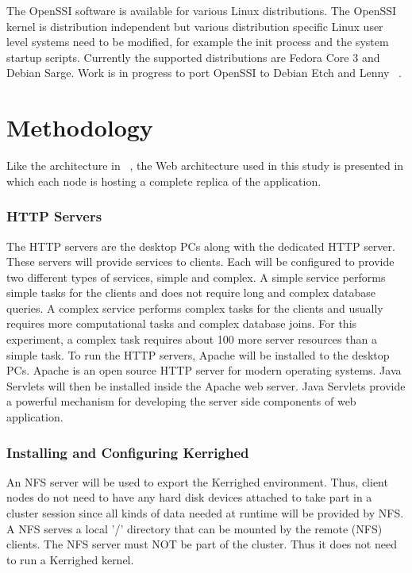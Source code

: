 \documentclass[preprint]{acm_proc_article-sp}
\begin{document}
The OpenSSI software is available for various Linux distributions. The OpenSSI kernel is distribution independent but various distribution specific Linux user level systems need to be modified, for example the init process and the system startup scripts. Currently the supported distributions are Fedora Core 3 and Debian Sarge. Work is in progress to port OpenSSI to Debian Etch and Lenny ~\citep{vallee10}.


\section{Methodology}
Like the architecture in ~\citet{derobles11}, the Web architecture used in this study is presented in which each node is hosting a complete replica of the application. 

\subsubsection{HTTP Servers}

The HTTP servers are the desktop PCs along with the dedicated HTTP server. These servers will provide services to clients. Each will be configured to provide two different types of services, simple and complex. A simple service performs simple tasks for the clients and does not require long and complex database queries. A complex service performs complex tasks for the clients and usually requires more computational tasks and complex database joins. For this experiment, a complex task requires about 100 more server resources than a simple task.
To run the HTTP servers, Apache will be installed to the desktop PCs. Apache is an open source HTTP server for modern operating systems. Java Servlets will then be installed inside the Apache web server. Java Servlets provide a powerful mechanism for developing the server side components of web application.

\subsubsection{Installing and Configuring Kerrighed}

An NFS server will be used to export the Kerrighed environment. Thus, client nodes do not need to have any hard disk devices attached to take part in a cluster session since all kinds of data needed at runtime will be provided by NFS. A NFS serves a local '/' directory that can be mounted by the remote (NFS) clients. The NFS server must NOT be part of the cluster. Thus it does not need to run a Kerrighed kernel. 
\end{document}
